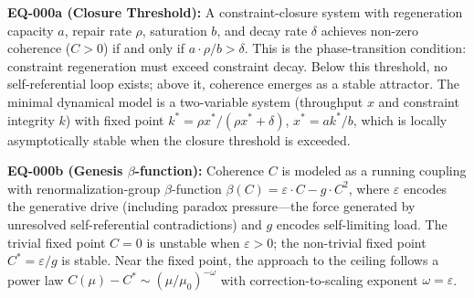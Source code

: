 \documentclass[12pt,a4paper]{article}
\begin{document}
\textbf{EQ-000a (Closure Threshold):} A constraint-closure system with regeneration capacity $a$, repair rate $\rho$, saturation $b$, and decay rate $\delta$ achieves non-zero coherence ($C > 0$) if and only if $a \cdot \rho / b > \delta$. This is the phase-transition condition: constraint regeneration must exceed constraint decay. Below this threshold, no self-referential loop exists; above it, coherence emerges as a stable attractor. The minimal dynamical model is a two-variable system (throughput $x$ and constraint integrity $k$) with fixed point $k^* = \rho x^* / (\rho x^* + \delta)$, $x^* = ak^*/b$, which is locally asymptotically stable when the closure threshold is exceeded.

\textbf{EQ-000b (Genesis $\beta$-function):} Coherence $C$ is modeled as a running coupling with renormalization-group $\beta$-function $\beta(C) = \varepsilon \cdot C - g \cdot C^2$, where $\varepsilon$ encodes the generative drive (including paradox pressure---the force generated by unresolved self-referential contradictions) and $g$ encodes self-limiting load. The trivial fixed point $C = 0$ is unstable when $\varepsilon > 0$; the non-trivial fixed point $C^* = \varepsilon/g$ is stable. Near the fixed point, the approach to the ceiling follows a power law $C(\mu) - C^* \sim (\mu/\mu_0)^{-\omega}$ with correction-to-scaling exponent $\omega = \varepsilon$.
\end{document}
